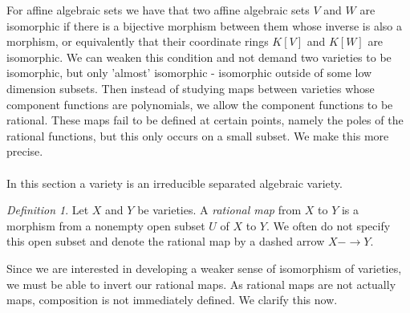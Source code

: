 \documentclass[BSc]{usydthesis}
\numberwithin{equation}{chapter}
\theoremstyle{remark}
\newtheorem{Definition}[equation]{Definition}
\begin{document}
For affine algebraic sets we have that two affine algebraic sets $V$ and $W$ are isomorphic if there is a bijective morphism between them whose inverse is also a morphism, or equivalently that their coordinate rings $K[V]$ and $K[W]$ are isomorphic. We can weaken this condition and not demand two varieties to be isomorphic, but only 'almost' isomorphic - isomorphic outside of some low dimension subsets. Then instead of studying maps between varieties whose component functions are polynomials, we allow the component functions to be rational. These maps fail to be defined at certain points, namely the poles of the rational functions, but this only occurs on a small subset. We make this more precise. \\ ~ \\
In this section a variety is an irreducible separated algebraic variety. 
\begin{Definition} Let $X$ and $Y$ be varieties. A {\em rational map} from $X$ to $Y$ is a morphism from a nonempty open subset $U$ of $X$ to $Y.$ We often do not specify this open subset and denote the rational map by a dashed arrow $X-\to Y.$
\end{Definition}

Since we are interested in developing a weaker sense of isomorphism of varieties, we must be able to invert our rational maps. As rational maps are not actually maps, composition is not immediately defined. We clarify this now.
\end{document}
